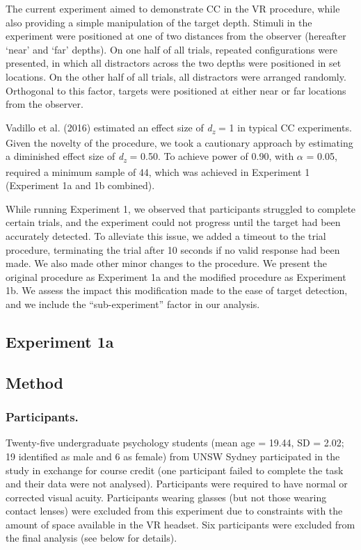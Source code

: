 \documentclass[
  man,floatsintext]{apa7}
\begin{document}
The current experiment aimed to demonstrate CC in the VR procedure, while also providing a simple manipulation of the target depth. Stimuli in the experiment were positioned at one of two distances from the observer (hereafter `near' and `far' depths). On one half of all trials, repeated configurations were presented, in which all distractors across the two depths were positioned in set locations. On the other half of all trials, all distractors were arranged randomly. Orthogonal to this factor, targets were positioned at either near or far locations from the observer.

Vadillo et al. (2016) estimated an effect size of \emph{d\textsubscript{z}} = 1 in typical CC experiments. Given the novelty of the procedure, we took a cautionary approach by estimating a diminished effect size of \emph{d\textsubscript{z}} = 0.50. To achieve power of 0.90, with \(\alpha\) = 0.05, required a minimum sample of 44, which was achieved in Experiment 1 (Experiment 1a and 1b combined).

While running Experiment 1, we observed that participants struggled to complete certain trials, and the experiment could not progress until the target had been accurately detected. To alleviate this issue, we added a timeout to the trial procedure, terminating the trial after 10 seconds if no valid response had been made. We also made other minor changes to the procedure. We present the original procedure as Experiment 1a and the modified procedure as Experiment 1b. We assess the impact this modification made to the ease of target detection, and we include the ``sub-experiment'' factor in our analysis.

\hypertarget{experiment-1a}{%
\subsection{Experiment 1a}\label{experiment-1a}}

\hypertarget{method}{%
\subsection{Method}\label{method}}

\hypertarget{participants.}{%
\subsubsection{Participants.}\label{participants.}}

Twenty-five undergraduate psychology students (mean age = 19.44, SD = 2.02; 19 identified as male and 6 as female) from UNSW Sydney participated in the study in exchange for course credit (one participant failed to complete the task and their data were not analysed). Participants were required to have normal or corrected visual acuity. Participants wearing glasses (but not those wearing contact lenses) were excluded from this experiment due to constraints with the amount of space available in the VR headset. Six participants were excluded from the final analysis (see below for details).
\end{document}
